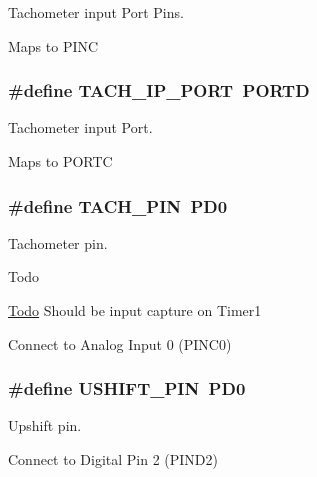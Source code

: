 Tachometer input Port Pins. 

Maps to P\-I\-N\-C \hypertarget{group__port_defs_ga9e9a01aac1a7ac7eab47b274ce737005}{
\subsubsection[{T\-A\-C\-H\-\_\-\-I\-P\-\_\-\-P\-O\-R\-T}]{\setlength{\rightskip}{0pt plus 5cm}\#define {\bf T\-A\-C\-H\-\_\-\-I\-P\-\_\-\-P\-O\-R\-T}~P\-O\-R\-T\-D}}\label{group__port_defs_ga9e9a01aac1a7ac7eab47b274ce737005}


Tachometer input Port. 

Maps to P\-O\-R\-T\-C \hypertarget{group__port_defs_gaf84d0d7a25d38271813b650eeb6a4228}{
\subsubsection[{T\-A\-C\-H\-\_\-\-P\-I\-N}]{\setlength{\rightskip}{0pt plus 5cm}\#define {\bf T\-A\-C\-H\-\_\-\-P\-I\-N}~P\-D0}}\label{group__port_defs_gaf84d0d7a25d38271813b650eeb6a4228}


Tachometer pin. 

\begin{DoxyRefDesc}{Todo}
\item[\hyperlink{todo__todo000002}{Todo}]Should be input capture on Timer1
\begin{DoxyItemize}
\item Connect to Analog Input 0 (P\-I\-N\-C0) 
\end{DoxyItemize}\end{DoxyRefDesc}
\hypertarget{group__port_defs_gac4a361c6ecdb8ef9a4c7a7253fa0feb8}{
\subsubsection[{U\-S\-H\-I\-F\-T\-\_\-\-P\-I\-N}]{\setlength{\rightskip}{0pt plus 5cm}\#define {\bf U\-S\-H\-I\-F\-T\-\_\-\-P\-I\-N}~P\-D0}}\label{group__port_defs_gac4a361c6ecdb8ef9a4c7a7253fa0feb8}


Upshift pin. 


\begin{DoxyItemize}
\item Connect to Digital Pin 2 (P\-I\-N\-D2) 
\end{DoxyItemize}